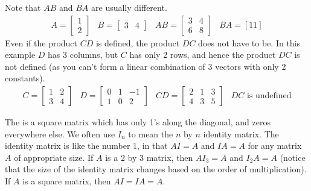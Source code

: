 \begin{example} 
Note that $AB$ and $BA$ are usually different.
$$\begin{array}{cccc}
A=\begin{bmatrix} 1\\2\end{bmatrix}&
B=\begin{bmatrix} 3&4\end{bmatrix}&
AB= \begin{bmatrix} 3&4\\6&8\end{bmatrix} &
BA = [11]\end{array}
$$
Even if the product $CD$ is defined, the product $DC$ does not have to be.  In this example $D$ has 3 columns, but $C$ has only 2 rows, and hence the product $DC$ is not defined (as you can't form a linear combination of 3 vectors with only 2 constants).
$$
\begin{array}{cccc}
C =\begin{bmatrix} 1&2\\3&4\end{bmatrix}&
D =\begin{bmatrix} 0&1&-1\\1&0&2\end{bmatrix}&
CD =\begin{bmatrix} 2&1&3\\4&3&5\end{bmatrix}&
DC \text{ is undefined}
\end{array}$$
\end{example}

The  is a square matrix which has only 1's along the diagonal, and zeros everywhere else. We often use $I_n$ to mean the $n$ by $n$ identity matrix. The identity matrix is like the number 1, in that $AI=A$ and $IA=A$ for any matrix $A$ of appropriate size.  If $A$ is a 2 by 3 matrix, then $AI_3=A$ and $I_2A=A$ (notice that the size of the identity matrix changes based on the order of multiplication).  If $A$ is a square matrix, then $AI=IA=A$.





